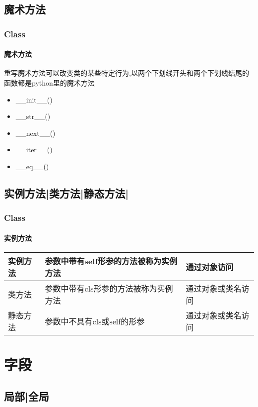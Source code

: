 \documentclass{beamer}
\begin{document}
\subsection{魔术方法}%
\begin{frame}[fragile]
	\frametitle{Class}
	\framesubtitle{魔术方法}
	重写魔术方法可以改变类的某些特定行为,以两个下划线开头和两个下划线结尾的函数都是python里的魔术方法
	\pause
	\begin{example}
		\begin{itemize}
			\item \_\_init\_\_()
			\item \_\_str\_\_()
			\item \_\_next\_\_()
			\item \_\_iter\_\_()
			\item \_\_eq\_\_()
		\end{itemize}

	\end{example}

\end{frame}

\subsection{实例方法|类方法|静态方法|}%
\begin{frame}[fragile]
	\frametitle{Class}
	\framesubtitle{实例方法}
	\begin{table}[htpb]
		\centering
		\begin{tabular}{| >{\centering\arraybackslash}m{3cm} | >{\centering\arraybackslash}m{3cm} | >{\centering\arraybackslash}m{3cm} |}			\hline
			实例方法 & 参数中带有self形参的方法被称为实例方法 & 通过对象访问    \\
			\hline
			类方法  & 参数中带有cls形参的方法被称为实例方法  & 通过对象或类名访问 \\
			\hline
			静态方法 & 参数中不具有cls或self的形参     & 通过对象或类名访问 \\
			\hline
		\end{tabular}	\end{table}
\end{frame}


\section{字段}%

\subsection{局部|全局}%
\end{document}
